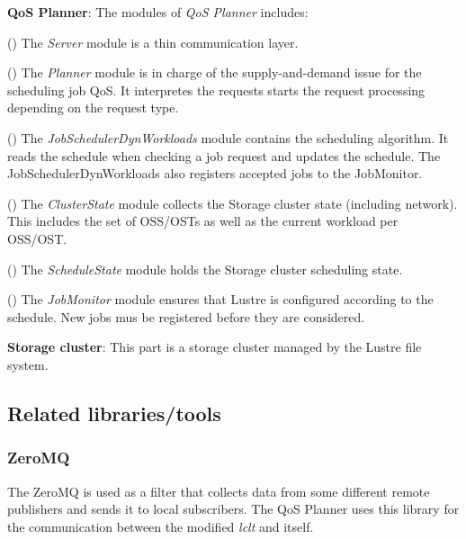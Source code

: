 \documentclass[10pt]{article}
\begin{document}
\textbf{QoS Planner}: The modules of \emph{QoS Planner} includes:

(\textbf{{}}) The \emph{Server} module is a thin communication layer.

(\textbf{{}})  The \emph{Planner} module is in charge of the supply-and-demand issue for the scheduling job QoS. It interpretes the requests starts the request processing depending on the request type.

(\textbf{{}}) The \emph{JobSchedulerDynWorkloads} module contains the scheduling algorithm. It reads the schedule when checking a job request and updates the schedule. The JobSchedulerDynWorkloads also registers accepted jobs to the JobMonitor.

(\textbf{{}}) The \emph{ClusterState} module collects the Storage cluster state (including network). This includes the set of OSS/OSTs as well as the current workload per OSS/OST.

(\textbf{{}}) The \emph{ScheduleState} module holds the Storage cluster scheduling state.

(\textbf{{}}) The \emph{JobMonitor} module ensures that Lustre is configured according to the schedule. New jobs mus be registered before they are considered.

\textbf{Storage cluster}: This part is a storage cluster managed by the Lustre file system.

%
\subsection{Related libraries/tools}
%
\subsubsection{ZeroMQ}
%
The ZeroMQ is used as a filter that collects data from some different remote publishers and sends it to local subscribers. The QoS Planner uses this library for the communication between the modified \emph{lclt} and itself.
\end{document}
